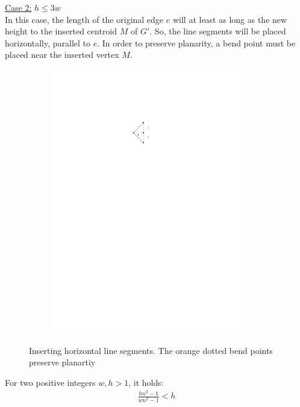 \underline{Case 2:} $h \leq 3w$\\
In this case, the length of the original edge $e$ will at least as long as the new height to the inserted centroid $M$ of $G'$. So, the line segments will be placed horizontally, parallel to $e$. In order to preserve planarity, a bend point must be placed near the inserted vertex $M$. 
\begin{figure}[H]
	\centering
	\begin{subfigure}{0.4\linewidth}
		\centering
		\includegraphics[width=0.9\textwidth,page=7]{drawings/maximal_planar.pdf}
	\end{subfigure}
	\caption{Inserting horizontal line segments. The orange dotted bend points preserve planartiy}\label{im:horizontal_insertion}
\end{figure}
\begin{lemma}
\end{lemma}
For two positive integers $w,h>1$, it holds:
\begin{align*}
	\frac{hn^2-1}{wn^2-1}<h
\end{align*}
